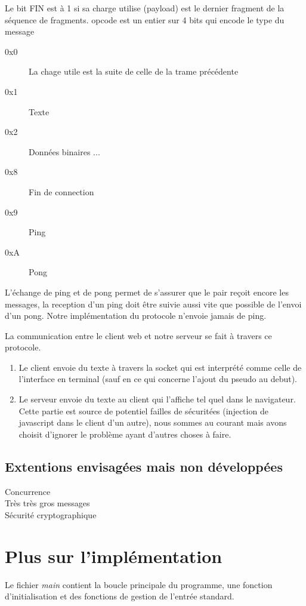 \documentclass[a4paper,10pt]{article} %
\begin{document}
Le bit \textrm{FIN} est à 1 si sa charge utilise (payload) est le dernier fragment de la séquence de fragments. \textrm{opcode} est un entier sur 4 bits qui encode le type du message

\begin{description}
\item[0x0] La chage utile est la suite de celle de la trame précédente
\item[0x1] Texte
\item[0x2] Données binaires
  ...
\item[0x8] Fin de connection
\item[0x9] Ping
\item[0xA] Pong
\end{description}

L'échange de ping et de pong permet de s'assurer que le pair reçoit encore les messages, la reception d'un ping doit être suivie aussi vite que possible de l'envoi d'un pong. Notre implémentation du protocole n'envoie jamais de ping.

La communication entre le client web et notre serveur se fait à travers ce protocole.
\begin{enumerate}
\item Le client envoie du texte à travers la socket qui est interprété comme celle de l'interface en terminal (sauf en ce qui concerne l'ajout du pseudo au debut).
\item Le serveur envoie du texte au client qui l'affiche tel quel dans le navigateur. Cette partie est source de potentiel failles de sécuritées (injection de javascript dans le client d'un autre), nous sommes au courant mais avons choisit d'ignorer le problème ayant d'autres choses à faire.
\end{enumerate}

\subsection{Extentions envisagées mais non développées}

\begin{description}
\item[Concurrence] %
\item[Très très gros messages]
\item[Sécurité cryptographique]
\end{description}

\section{Plus sur l'implémentation\label{sec:implem}}
Le fichier \textit{main} contient la boucle principale du programme, une fonction d'initialisation et des fonctions de gestion de l'entrée standard.\\
\end{document}
